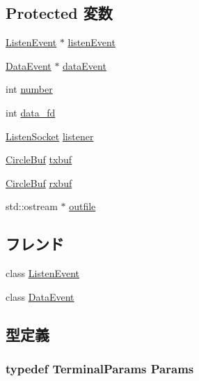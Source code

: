 \subsection*{Protected 変数}
\begin{DoxyCompactItemize}
\item 
\hyperlink{classTerminal_1_1ListenEvent}{ListenEvent} $\ast$ \hyperlink{classTerminal_ad7f258b1b869b6152bc5040c38b79d39}{listenEvent}
\item 
\hyperlink{classTerminal_1_1DataEvent}{DataEvent} $\ast$ \hyperlink{classTerminal_a7a8501aba170bc353fe057e372612b93}{dataEvent}
\item 
int \hyperlink{classTerminal_a7106e2abc437ad981830d14176d15f09}{number}
\item 
int \hyperlink{classTerminal_ae9994b62da601da68d4969c52d088910}{data\_\-fd}
\item 
\hyperlink{classListenSocket}{ListenSocket} \hyperlink{classTerminal_acf9ea448b26a541b4a197f1ca92f700b}{listener}
\item 
\hyperlink{classCircleBuf}{CircleBuf} \hyperlink{classTerminal_a49636a97ed2e363e47ffc2f0e2899b66}{txbuf}
\item 
\hyperlink{classCircleBuf}{CircleBuf} \hyperlink{classTerminal_af804c397682f3186a1fdd9919d93dea1}{rxbuf}
\item 
std::ostream $\ast$ \hyperlink{classTerminal_a15518d8416f4c0090ede0c9699a7bef8}{outfile}
\end{DoxyCompactItemize}
\subsection*{フレンド}
\begin{DoxyCompactItemize}
\item 
class \hyperlink{classTerminal_a9465cdda0008b0e7b7f9ac919cd9cca6}{ListenEvent}
\item 
class \hyperlink{classTerminal_a8a93830b802d4fc8562fa54ead43b1f9}{DataEvent}
\end{DoxyCompactItemize}


\subsection{型定義}
\hypertarget{classTerminal_aa60a1659eb9e560503e47d6cbedd5ace}{
\subsubsection[{Params}]{\setlength{\rightskip}{0pt plus 5cm}typedef TerminalParams {\bf Params}}}
\label{classTerminal_aa60a1659eb9e560503e47d6cbedd5ace}


